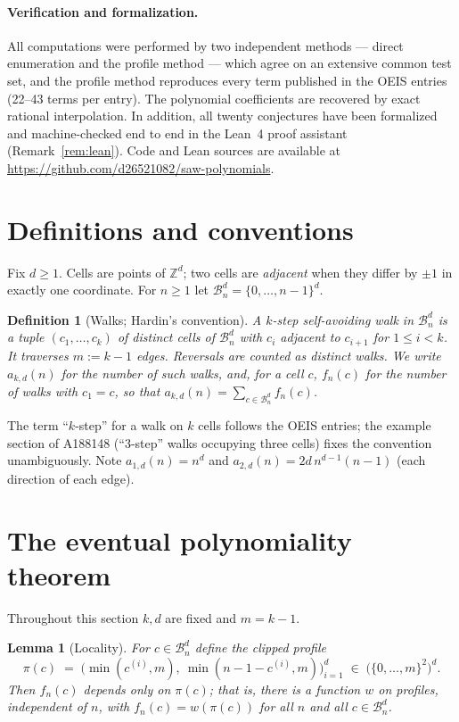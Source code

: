 \documentclass[11pt]{article}
\newtheorem{lemma}[theorem]{Lemma}
\newtheorem{definition}[theorem]{Definition}
\newcommand{\ZZ}{\mathbb{Z}}
\newcommand{\GBox}{\mathcal{B}}
\begin{document}
\paragraph{Verification and formalization.}
All computations were performed by two independent methods --- direct
enumeration and the profile method --- which agree on an extensive common
test set, and the profile method reproduces every term published in the
OEIS entries (22--43 terms per entry).  The polynomial coefficients are recovered by exact rational
interpolation.  In addition, all twenty conjectures have been formalized and
machine-checked end to end in the Lean~4 proof assistant
(Remark~\ref{rem:lean}).  Code and Lean sources are available at
\url{https://github.com/d26521082/saw-polynomials}.

\section{Definitions and conventions}\label{sec:defs}

Fix $d \ge 1$.  Cells are points of $\ZZ^d$; two cells are
\emph{adjacent} when they differ by $\pm 1$ in exactly one coordinate.
For $n \ge 1$ let $\GBox_n^d = \{0,\dots,n-1\}^d$.

\begin{definition}[Walks; Hardin's convention]
A \emph{$k$-step self-avoiding walk} in $\GBox_n^d$ is a tuple
$(c_1,\dots,c_k)$ of distinct cells of $\GBox_n^d$ with $c_i$ adjacent to
$c_{i+1}$ for $1 \le i < k$.  It traverses $m := k-1$ edges.  Reversals
are counted as distinct walks.  We write $a_{k,d}(n)$ for the number of
such walks, and, for a cell $c$, $f_n(c)$ for the number of walks with
$c_1 = c$, so that $a_{k,d}(n) = \sum_{c \in \GBox_n^d} f_n(c)$.
\end{definition}

The term ``$k$-step'' for a walk on $k$ cells follows the OEIS entries;
the example section of A188148 (``3-step'' walks occupying three cells)
fixes the convention unambiguously.  Note $a_{1,d}(n) = n^d$ and
$a_{2,d}(n) = 2d\,n^{d-1}(n-1)$ (each direction of each edge).

\section{The eventual polynomiality theorem}\label{sec:theorem}

Throughout this section $k, d$ are fixed and $m = k - 1$.

\begin{lemma}[Locality]\label{lem:locality}
For $c \in \GBox_n^d$ define the \emph{clipped profile}
\[
  \pi(c) \;=\; \bigl(\min(c^{(i)}, m),\ \min(n-1-c^{(i)}, m)\bigr)_{i=1}^{d}
  \;\in\; \bigl(\{0,\dots,m\}^2\bigr)^d .
\]
Then $f_n(c)$ depends only on $\pi(c)$; that is, there is a function $w$
on profiles, independent of $n$, with $f_n(c) = w(\pi(c))$ for all $n$
and all $c \in \GBox_n^d$.
\end{lemma}
\end{document}
